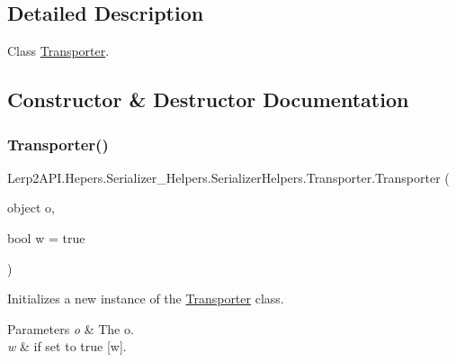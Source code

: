 \subsection{Detailed Description}
Class \hyperlink{class_lerp2_a_p_i_1_1_hepers_1_1_serializer___helpers_1_1_serializer_helpers_1_1_transporter}{Transporter}. 



\subsection{Constructor \& Destructor Documentation}
\mbox{\label{class_lerp2_a_p_i_1_1_hepers_1_1_serializer___helpers_1_1_serializer_helpers_1_1_transporter_ae28282bff488fa5effe3853b5e9584a3}} 
\subsubsection{\texorpdfstring{Transporter()}{Transporter()}}
{\footnotesize\ttfamily Lerp2\+A\+P\+I.\+Hepers.\+Serializer\+\_\+\+Helpers.\+Serializer\+Helpers.\+Transporter.\+Transporter (\begin{DoxyParamCaption}\item[{object}]{o,  }\item[{bool}]{w = {\ttfamily true} }\end{DoxyParamCaption})\hspace{0.3cm}{\ttfamily [inline]}}



Initializes a new instance of the \hyperlink{class_lerp2_a_p_i_1_1_hepers_1_1_serializer___helpers_1_1_serializer_helpers_1_1_transporter}{Transporter} class. 


\begin{DoxyParams}{Parameters}
{\em o} & The o.\\
\hline
{\em w} & if set to {\ttfamily true} \mbox{[}w\mbox{]}.\\
\hline
\end{DoxyParams}



